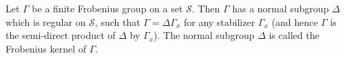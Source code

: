 Let $\Gamma$ be a finite Frobenius group on a set $\mathcal{S}$. Then $\Gamma$ has a normal subgroup $\Delta$ which is regular on $\mathcal{S}$, such that $\Gamma = \Delta \Gamma_x$ for any stabilizer $\Gamma_x$ (and hence $\Gamma$ is the semi-direct product of $\Delta$ by $\Gamma_x$). The normal subgroup $\Delta$ is called the Frobenius kernel of $\Gamma$.
